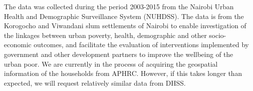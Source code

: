 \documentclass[12pt]{article}
\begin{document}
The data was collected during the period 2003-2015 from the Nairobi Urban Health and Demographic Surveillance System (NUHDSS). The data is from the Korogocho and Viwandani slum settlements of Nairobi to enable investigation of the linkages between urban poverty, health, demographic and other socio-economic outcomes, and facilitate the evaluation of interventions implemented by government and other development partners to improve the wellbeing of the urban poor. We are currently in the process of acquiring the geospatial information of the households from APHRC. However, if this takes longer than expected, we will request relatively similar data from DHSS. 


%
%
%
\end{document}
